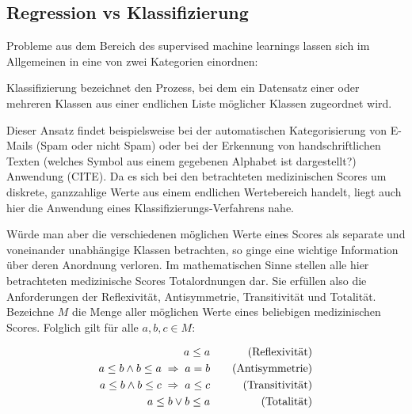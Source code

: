 \subsection{Regression vs Klassifizierung}

Probleme aus dem Bereich des supervised machine learnings lassen sich im Allgemeinen in eine von zwei Kategorien einordnen:

Klassifizierung bezeichnet den Prozess, bei dem ein Datensatz einer oder mehreren Klassen aus einer endlichen Liste möglicher Klassen zugeordnet wird. 

Dieser Ansatz findet beispielsweise bei der automatischen Kategorisierung von E-Mails (Spam oder nicht Spam) oder bei der Erkennung von handschriftlichen Texten (welches Symbol aus einem gegebenen Alphabet ist dargestellt?) Anwendung (CITE). Da es sich bei den betrachteten medizinischen Scores um diskrete, ganzzahlige Werte aus einem endlichen Wertebereich handelt, liegt auch hier die Anwendung eines Klassifizierungs-Verfahrens nahe.

Würde man aber die verschiedenen möglichen Werte eines Scores als separate und voneinander unabhängige Klassen betrachten, so ginge eine wichtige Information über deren Anordnung verloren. Im mathematischen Sinne stellen alle hier betrachteten medizinische Scores Totalordnungen dar. Sie erfüllen also die Anforderungen der Reflexivität, Antisymmetrie, Transitivität und Totalität. Bezeichne $M$ die Menge aller möglichen Werte eines beliebigen medizinischen Scores. Folglich gilt für alle $a,b,c \in M$:

\begin{equation*}
    \centering
    \begin{aligned}[c]
        a \leq a\\
        a \leq b \land b \leq a \; \Rightarrow \; a=b\\
        a \leq b \land b \leq c \; \Rightarrow \; a \leq c\\
        a \leq b \lor b \leq a
    \end{aligned}
    \qquad
    \begin{aligned}[c]
        \text{(Reflexivität)}\\
        \text{(Antisymmetrie)}\\
        \text{(Transitivität)}\\
        \text{(Totalität)}
    \end{aligned}
\end{equation*}


